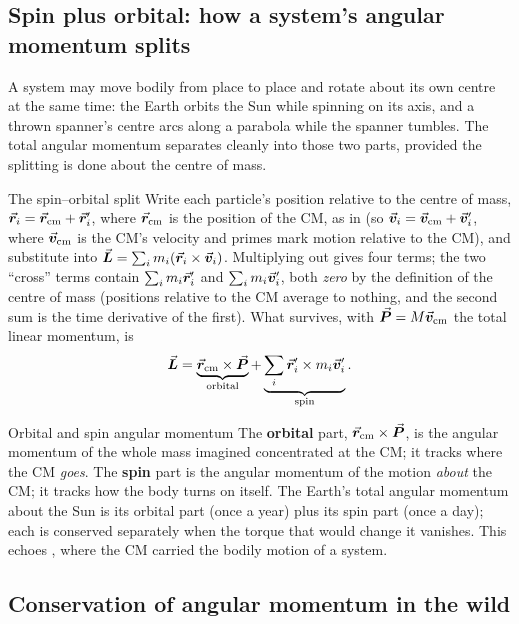 \subsection{Spin plus orbital: how a system's angular momentum splits}
A system may move bodily from place to place and rotate about its own centre at the same time: the Earth
orbits the Sun while spinning on its axis, and a thrown spanner's centre arcs along a parabola while the
spanner tumbles. The total angular momentum separates cleanly into those two parts, provided the
splitting is done about the centre of mass.

\begin{derivbox}{The spin--orbital split}
Write each particle's position relative to the centre of mass, $\vec{\bm{r}}_i=\vec{\bm{r}}_{\text{cm}}+\vec{\bm{r}}_i'$, where
$\vec{\bm{r}}_{\text{cm}}$ is the position of the CM, as in  (so
$\vec{\bm{v}}_i=\vec{\bm{v}}_{\text{cm}}+\vec{\bm{v}}_i'$, where $\vec{\bm{v}}_{\text{cm}}$ is the CM's velocity and primes mark motion relative to the CM), and substitute into $\vec{\bm{L}}=\sum_i m_i(\vec{\bm{r}}_i\times\vec{\bm{v}}_i)$. Multiplying out
gives four terms; the two ``cross'' terms contain $\sum_i m_i\vec{\bm{r}}_i'$ and $\sum_i m_i\vec{\bm{v}}_i'$, both \emph{zero}
by the definition of the centre of mass (positions relative to the CM average to nothing, and the
second sum is the time derivative of the first). What survives, with $\vec{\bm{P}}=M\vec{\bm{v}}_{\text{cm}}$ the total linear momentum, is
\[
\vec{\bm{L}}=\underbrace{\vec{\bm{r}}_{\text{cm}}\times\vec{\bm{P}}}_{\text{orbital}}
+\underbrace{\sum_i \vec{\bm{r}}_i'\times m_i\vec{\bm{v}}_i'}_{\text{spin}}.
\]
\end{derivbox}

\begin{keybox}{Orbital and spin angular momentum}
The \textbf{orbital} part, $\vec{\bm{r}}_{\text{cm}}\times\vec{\bm{P}}$, is the angular momentum of the whole mass
imagined concentrated at the CM; it tracks where the CM \emph{goes}. The \textbf{spin} part is the
angular momentum of the motion \emph{about} the CM; it tracks how the body turns on itself. The Earth's
total angular momentum about the Sun is its orbital part (once a year) plus its spin part (once a day);
each is conserved separately when the torque that would change it vanishes. This echoes , where the CM carried the bodily motion of a system.
\end{keybox}

\subsection{Conservation of angular momentum in the wild}

